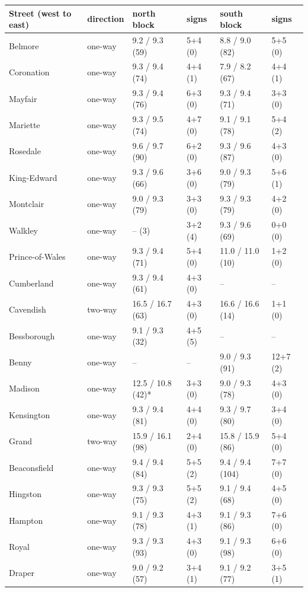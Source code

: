 \documentclass[11pt,a4paper]{article}
\begin{document}
{\small\begin{longtable}{@{}llllll@{}}\toprule Street (west to east) & direction & north block & signs & south block & signs\\ \midrule
Belmore & one-way & 9.2 / 9.3 (59) & 5+4 (0) & 8.8 / 9.0 (82) & 5+5 (0) \\
Coronation & one-way & 9.3 / 9.4 (74) & 4+4 (1) & 7.9 / 8.2 (67) & 4+4 (1) \\
Mayfair & one-way & 9.3 / 9.4 (76) & 6+3 (0) & 9.3 / 9.4 (71) & 3+3 (0) \\
Mariette & one-way & 9.3 / 9.5 (74) & 4+7 (0) & 9.1 / 9.1 (78) & 5+4 (2) \\
Rosedale & one-way & 9.6 / 9.7 (90) & 6+2 (0) & 9.3 / 9.6 (87) & 4+3 (0) \\
King-Edward & one-way & 9.3 / 9.6 (66) & 3+6 (0) & 9.0 / 9.3 (79) & 5+6 (1) \\
Montclair & one-way & 9.0 / 9.3 (79) & 3+3 (0) & 9.3 / 9.3 (79) & 4+2 (0) \\
Walkley & one-way & -- (3) & 3+2 (4) & 9.3 / 9.6 (69) & 0+0 (0) \\
Prince-of-Wales & one-way & 9.3 / 9.4 (71) & 5+4 (0) & 11.0 / 11.0 (10) & 1+2 (0) \\
Cumberland & one-way & 9.3 / 9.4 (61) & 4+3 (0) & -- & -- \\
Cavendish & two-way & 16.5 / 16.7 (63) & 4+3 (0) & 16.6 / 16.6 (14) & 1+1 (0) \\
Bessborough & one-way & 9.1 / 9.3 (32) & 4+5 (5) & -- & -- \\
Benny & one-way & -- & -- & 9.0 / 9.3 (91) & 12+7 (2) \\
Madison & one-way & 12.5 / 10.8 (42)* & 3+3 (0) & 9.0 / 9.3 (78) & 4+3 (0) \\
Kensington & one-way & 9.3 / 9.4 (81) & 4+4 (0) & 9.3 / 9.7 (80) & 3+4 (0) \\
Grand & two-way & 15.9 / 16.1 (98) & 2+4 (0) & 15.8 / 15.9 (86) & 5+4 (0) \\
Beaconsfield & one-way & 9.4 / 9.4 (84) & 5+5 (2) & 9.4 / 9.4 (104) & 7+7 (0) \\
Hingston & one-way & 9.3 / 9.3 (75) & 5+5 (2) & 9.1 / 9.4 (68) & 4+5 (0) \\
Hampton & one-way & 9.1 / 9.3 (78) & 4+3 (1) & 9.1 / 9.3 (86) & 7+6 (0) \\
Royal & one-way & 9.3 / 9.3 (93) & 4+3 (0) & 9.1 / 9.3 (98) & 6+6 (0) \\
Draper & one-way & 9.0 / 9.2 (57) & 3+4 (1) & 9.1 / 9.2 (77) & 3+5 (1) \\

\end{longtable}}
\end{document}
